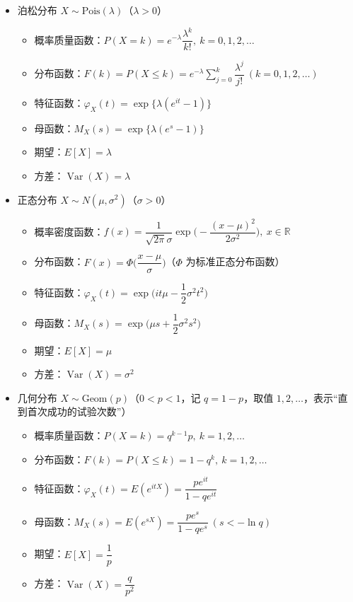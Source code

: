 \begin{itemize}
  \item 泊松分布 $X\sim \mathrm{Pois}(\lambda)$（$\lambda>0$）
  \begin{itemize}
    \item 概率质量函数：$P(X=k)=e^{-\lambda}\dfrac{\lambda^k}{k!},\ k=0,1,2,\dots$
    \item 分布函数：$F(k)=P(X\le k)=e^{-\lambda}\sum_{j=0}^k\dfrac{\lambda^j}{j!}\ (k=0,1,2,\dots)$
    \item 特征函数：$\varphi_X(t)=\exp\{\lambda(e^{it}-1)\}$
    \item 母函数：$M_X(s)=\exp\{\lambda(e^{s}-1)\}$
    \item 期望：$E[X]=\lambda$
    \item 方差：$\operatorname{Var}(X)=\lambda$
  \end{itemize}

  \item 正态分布 $X\sim N(\mu,\sigma^2)$（$\sigma>0$）
  \begin{itemize}
    \item 概率密度函数：$f(x)=\dfrac{1}{\sqrt{2\pi}\sigma}\exp\!\Big(-\dfrac{(x-\mu)^2}{2\sigma^2}\Big),\ x\in\mathbb R$
    \item 分布函数：$F(x)=\Phi\!\Big(\dfrac{x-\mu}{\sigma}\Big)$（$\Phi$ 为标准正态分布函数）
    \item 特征函数：$\varphi_X(t)=\exp\!\Big(it\mu-\dfrac{1}{2}\sigma^2 t^2\Big)$
    \item 母函数：$M_X(s)=\exp\!\Big(\mu s+\dfrac{1}{2}\sigma^2 s^2\Big)$
    \item 期望：$E[X]=\mu$
    \item 方差：$\operatorname{Var}(X)=\sigma^2$
  \end{itemize}
\item 几何分布 $X\sim \mathrm{Geom}(p)$（$0<p<1$，记 $q=1-p$，取值 $1,2,\dots$，表示“直到首次成功的试验次数”）
\begin{itemize}
  \item 概率质量函数：$P(X=k)=q^{k-1}p,\ k=1,2,\dots$
  \item 分布函数：$F(k)=P(X\le k)=1-q^{k},\ k=1,2,\dots$
  \item 特征函数：$\varphi_X(t)=E(e^{itX})=\dfrac{pe^{it}}{1-qe^{it}}$
  \item 母函数：$M_X(s)=E(e^{sX})=\dfrac{pe^{s}}{1-qe^{s}}\ (s<-\ln q)$
  \item 期望：$E[X]=\dfrac{1}{p}$
  \item 方差：$\operatorname{Var}(X)=\dfrac{q}{p^2}$
\end{itemize}
 


\end{itemize}
